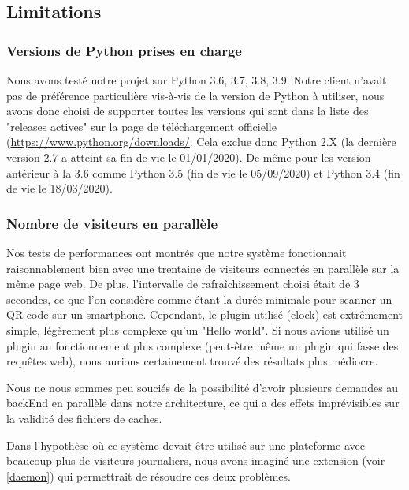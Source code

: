 \documentclass[a4paper,12pt]{article}
\begin{document}
\subsection{Limitations}

\subsubsection{Versions de Python prises en charge}
\noindent Nous avons testé notre projet sur Python 3.6, 3.7, 3.8, 3.9. 
Notre client n'avait pas de préférence particulière vis-à-vis de la version de Python à utiliser, nous avons donc choisi de supporter toutes les versions qui sont dans la liste des "releases actives" sur la page de téléchargement officielle (\url{https://www.python.org/downloads/}. Cela exclue donc Python 2.X (la dernière version 2.7 a atteint sa fin de vie le 01/01/2020). De même pour les version antérieur à la 3.6 comme Python 3.5 (fin de vie le 05/09/2020) et Python 3.4 (fin de vie le 18/03/2020).

\subsubsection{Nombre de visiteurs en parallèle}
\noindent Nos tests de performances ont montrés que notre système fonctionnait raisonnablement bien avec une trentaine de visiteurs connectés en parallèle sur la même page web. De plus, l'intervalle de rafraîchissement choisi était de 3 secondes, ce que l'on considère comme étant la durée minimale pour scanner un QR code sur un smartphone. Cependant, le plugin utilisé (clock) est extrêmement simple, légèrement plus complexe qu'un "Hello world". Si nous avions utilisé un plugin au fonctionnement plus complexe (peut-être même un plugin qui fasse des requêtes web), nous aurions certainement trouvé des résultats plus médiocre.

\noindent Nous ne nous sommes peu souciés de la possibilité d'avoir plusieurs demandes au backEnd en parallèle dans notre architecture, ce qui a des effets imprévisibles sur la validité des fichiers de caches.

\noindent Dans l'hypothèse où ce système devait être utilisé sur une plateforme avec beaucoup plus de visiteurs journaliers, nous avons imaginé une extension (voir \ref{daemon}) qui permettrait de résoudre ces deux problèmes.
\end{document}
